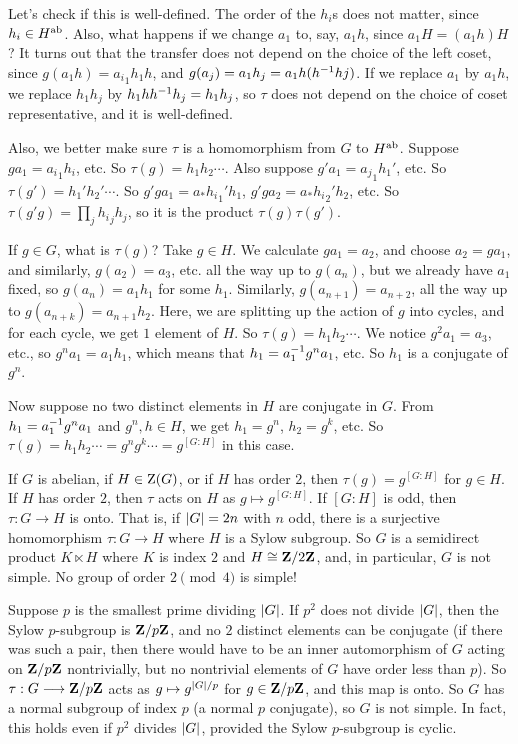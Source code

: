 \documentclass[11pt, twoside]{amsart}
\begin{document}
Let's check if this is well-defined. The order of the $h_i$s does not matter, since $h_i\in H\textsuperscript{ab}$. Also, what happens if we change $a_1$ to, say, $a_1h$, since $a_1H = (a_1h)H$? It turns out that the transfer does not depend on the choice of the left coset, since $g(a_1h) = {a_i}_1 h_1h$, and $g(a_j) = a_1 h_j = a_1h(h^{-1} hj)$. If we replace $a_1$ by $a_1h$, we replace $h_1h_j$ by $h_1hh^{-1} h_j = h_1h_j$, so $\tau$ does not depend on the choice of coset representative, and it is well-defined.

Also, we better make sure $\tau$ is a homomorphism from $G$ to $H\textsuperscript{ab}$. Suppose $ga_1 = {a_i}_1h_i$, etc. So $\tau(g) = h_1h_2\cdots$. Also suppose $g'a_1 = {a_j}_1h_1'$, etc. So $\tau(g') = h_1'h_2'\cdots$. So $g'ga_1 = a_* {h_i}_1' h_1$, $g'ga_2 = a_* {h_i}_2' h_2$, etc. So $\tau(g'g)= \prod_j {h_i}_j h_j$, so it is the product $\tau(g)\tau(g')$.

If $g\in G$, what is $\tau(g)$? Take $g\in H$. We calculate $ga_1=a_2$, and choose $a_2 =ga_1$, and similarly, $g(a_2) = a_3$, etc. all the way up to $g(a_n)$, but we already have $a_1$ fixed, so $g(a_n)=a_1h_1$ for some $h_1$. Similarly, $g(a_{n+1}) = a_{n+2}$, all the way up to $g(a_{n+k}) = a_{n+1} h_2$. Here, we are splitting up the action of $g$ into cycles, and for each cycle, we get $1$ element of $H$. So $\tau(g) = h_1h_2\cdots$. We notice $g^2a_1 = a_3$, etc., so $g^na_1 =  a_1h_1$, which means that $h_1 = a_1^{-1} g^na_1$, etc. So $h_1$ is a conjugate of $g^n$. 

Now suppose no two distinct elements in $H$ are conjugate in $G$. From $h_1 = a_1^{-1} g^na_1$ and $g^n,h\in H$, we get $h_1 = g^n$, $h_2 = g^k$, etc. So $\tau(g) = h_1h_2\cdots = g^ng^k\cdots = g^{[G:H]}$ in this case.

If $G$ is abelian, if $H\in \operatorname{Z}(G)$, or if $H$ has order $2$, then $\tau(g) = g^{[G:H]}$ for $g\in H$. If $H$ has order $2$, then $\tau$ acts on $H$ as  $g\mapsto g^{[G:H]}$. If $[G:H]$ is odd, then $\tau : G\longrightarrow H$ is onto. That is, if $\left \lvert G \right \rvert= 2n$ with $n$ odd, there is a surjective homomorphism $\tau : G\longrightarrow H$ where $H$ is a Sylow subgroup. So $G$ is a semidirect product $K\ltimes H$ where $K$ is index $2$ and $H\cong \mathbf{Z}/2\mathbf{Z} $, and, in particular, $G$ is not simple. No group of order $2\pmod 4$ is simple! 

Suppose $p$ is the smallest prime dividing $\left \lvert G \right \rvert$. If $p^2$ does not divide $\left \lvert G \right \rvert$, then the Sylow $p$-subgroup is $\mathbf{Z}/p\mathbf{Z}$, and no $2$ distinct elements can be conjugate (if there was such a pair, then there would have to be an inner automorphism of $G$ acting on $\mathbf{Z}/p\mathbf{Z}$ nontrivially, but no nontrivial elements of $G$ have order less than $p$). So $\tau : G\longrightarrow \mathbf{Z}/p\mathbf{Z}$ acts as $g\mapsto g^{\left \lvert G \right \rvert /p}$ for $g\in \mathbf{Z}/p\mathbf{Z}$, and this map is onto. So $G$ has a normal subgroup of index $p$ (a normal $p$ conjugate), so $G$ is not simple. In fact, this holds even if $p^2$ divides $\left \lvert G \right \rvert$, provided the Sylow $p$-subgroup is cyclic.
\end{document}
